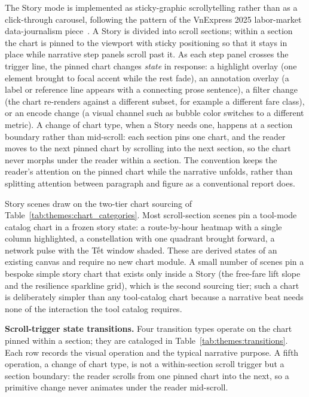 The Story mode is implemented as sticky-graphic scrollytelling rather
than as a click-through carousel, following the pattern of the
VnExpress 2025 labor-market data-journalism
piece~\cite{vnexpress2025labour}. A Story is divided into scroll
sections; within a section the chart is pinned to the viewport with
sticky positioning so that it stays in place while narrative
step panels scroll past it. As each step panel crosses the trigger line,
the pinned chart changes \emph{state} in response: a highlight overlay
(one element brought to focal accent while the rest fade), an
annotation overlay (a label or reference line appears with a
connecting prose sentence), a filter change (the chart re-renders
against a different subset, for example a different fare class), or an
encode change (a visual channel such as bubble color switches to a
different metric). A change of chart type, when a Story needs one,
happens at a section boundary rather than mid-scroll: each section
pins one chart, and the reader moves to the next pinned chart by
scrolling into the next section, so the chart never morphs under the
reader within a section. The convention keeps the reader's attention
on the pinned chart while the narrative unfolds, rather than splitting
attention between paragraph and figure as a conventional report does.

Story scenes draw on the two-tier chart sourcing of
Table~\ref{tab:themes:chart_categories}. Most scroll-section scenes
pin a tool-mode catalog chart in a frozen story state: a route-by-hour
heatmap with a single column highlighted, a constellation with one
quadrant brought forward, a network pulse with the Tết window shaded.
These are derived states of an existing canvas and require no new
chart module. A small number of scenes pin a bespoke simple story
chart that exists only inside a Story (the free-fare lift slope and
the resilience sparkline grid), which is the second sourcing tier; such
a chart is deliberately simpler than any tool-catalog chart because a
narrative beat needs none of the interaction the tool catalog
requires.

\noindent\textbf{Scroll-trigger state transitions.} Four transition types operate on the chart pinned within a section;
they are cataloged in Table~\ref{tab:themes:transitions}. Each row
records the visual operation and the typical narrative purpose. A fifth
operation, a change of chart type, is not a within-section scroll
trigger but a section boundary: the reader scrolls from one pinned
chart into the next, so a primitive change never animates under the
reader mid-scroll.

